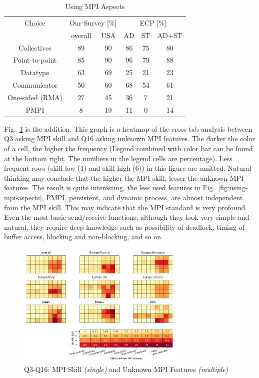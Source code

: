 \documentclass[conference,10pt,letterpaper]{IEEEtran}
\begin{document}
\begin{table}[htb]%
\begin{center}%
\caption{Using MPI Aspects}\label{tab:using-mpi-aspects}%
\begin{tabular}{c||c|c||c|c|c}%
\hline%
Choice & \multicolumn{2}{c||}{Our Survey [\%]} &
\multicolumn{3}{c}{ECP [\%]} \\
\cline{2-6}%
 & overall & USA & AD & ST & AD+ST \\
\hline%
Collectives & 89 & 90 & 86 & 75 & 80 \\
Point-to-point & 85 & 90 & 96 & 79 & 88 \\
Datatype & 63 & 69 & 25 & 21 & 23 \\
Communicator & 50 & 60 & 68 & 54 & 61 \\
One-sided (RMA) & 27 & 45 & 36 & 7 & 21 \\
PMPI & 8 & 19 & 11 & 0 & 14 \\
\hline%
\end{tabular}%
\end{center}%
\end{table}%

Fig.~\ref{fig:skill-and-aspects} is the addition. This graph is a
heatmap of the cross-tab analysis between Q3 asking MPI skill and Q16
asking unknown MPI features. The darker the color of a cell, the
higher the frequency (Legend combined with color bar can be found at
the bottom right. The numbers in the legend cells are
percentage). Less frequent 
rows (skill low (1) and skill high (6)) in this figure are
omitted. Natural thinking may conclude 
that the higher the MPI skill, lesser the unknown MPI features. The
result is quite interesting, the less used features in
Fig.~\ref{fig:using-mpi-aspects}, PMPI, persistent, and dynamic
process, are almost independent from the MPI skill. This may indicate
that the MPI standard is very profound. Even the most basic
send/receive functions, although they look very simple and natural,
they require deep knowledge such as possibility of deadlock, timing of
buffer access, blocking and non-blocking, and so on.
  
\begin{figure}[htb]
\begin{center}
\includegraphics[width=8cm]{Figs/Q3-Q16.pdf}
\caption{Q3-Q16: MPI Skill {\it(single)} and Unknown MPI Features {\it(multiple)}}
\label{fig:skill-and-aspects}
\end{center}
\end{figure}
\end{document}
